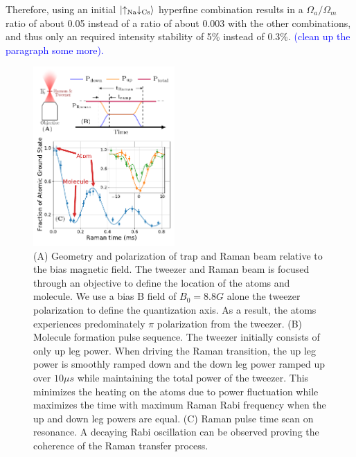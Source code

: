 \documentclass[aps,prl,twocolumn,superscriptaddress]{revtex4-1}
\begin{document}
Therefore, using an initial $\ket{\uparrow_{\text{Na}} \downarrow_{\text{Cs}}}$ hyperfine combination results in a $ \Omega_a/\Omega_m$ ratio of about 0.05 instead of a ratio of about 0.003 with the other combinations, and thus only an required intensity stability of 5\% instead of 0.3\%.
\textcolor{blue}{(clean up the paragraph some more).} %

\begin{figure}[ht!]
  \includegraphics[width=0.48\textwidth]{fig2.pdf}
  \caption{
    (A) Geometry and polarization of trap and Raman beam relative to the bias magnetic field.
    The tweezer and Raman beam is focused through an objective to define the location of the
    atoms and molecule.
    We use a bias B field of $B_0=8.8 G$ alone the tweezer polarization
    to define the quantization axis.
    As a result, the atoms experiences predominately $\pi$ polarization from the tweezer.
    (B) Molecule formation pulse sequence. The tweezer initially consists of only up leg power.
    When driving the Raman transition, the up leg power is smoothly ramped down and
    the down leg power ramped up over $10\mu s$ while maintaining the total power of the tweezer.
    This minimizes the heating on the atoms due to power fluctuation while maximizes the time
    with maximum Raman Rabi frequency when the up and down leg powers are equal.
    (C) Raman pulse time scan on resonance.
    A decaying Rabi oscillation can be observed proving the coherence of
    the Raman transfer process.
    \label{f-raman}}
\end{figure}
\end{document}
